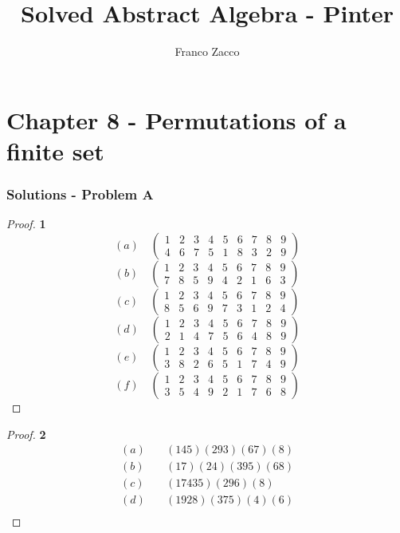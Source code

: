 \documentclass[11pt]{article}
\title{\textbf{Solved Abstract Algebra - Pinter}}
\author{Franco Zacco}
\date{}
\begin{document}
\maketitle
\thispagestyle{empty}

\section*{Chapter 8 - Permutations of a finite set}

	\subsubsection*{Solutions - Problem A}
		\begin{proof}{\textbf{1}} 
			$$(a) \quad \begin{pmatrix}
				1 & 2 & 3 & 4 & 5 & 6 & 7 & 8 & 9 \\
				4 & 6 & 7 & 5 & 1 & 8 & 3 & 2 & 9
			\end{pmatrix}$$
			$$(b) \quad \begin{pmatrix}
				1 & 2 & 3 & 4 & 5 & 6 & 7 & 8 & 9 \\
				7 & 8 & 5 & 9 & 4 & 2 & 1 & 6 & 3
			\end{pmatrix}$$
			$$(c) \quad \begin{pmatrix}
				1 & 2 & 3 & 4 & 5 & 6 & 7 & 8 & 9 \\
				8 & 5 & 6 & 9 & 7 & 3 & 1 & 2 & 4
			\end{pmatrix}$$
			$$(d) \quad \begin{pmatrix}
				1 & 2 & 3 & 4 & 5 & 6 & 7 & 8 & 9 \\
				2 & 1 & 4 & 7 & 5 & 6 & 4 & 8 & 9
			\end{pmatrix}$$
			$$(e) \quad \begin{pmatrix}
				1 & 2 & 3 & 4 & 5 & 6 & 7 & 8 & 9 \\
				3 & 8 & 2 & 6 & 5 & 1 & 7 & 4 & 9
			\end{pmatrix}$$
			$$(f) \quad \begin{pmatrix}
				1 & 2 & 3 & 4 & 5 & 6 & 7 & 8 & 9 \\
				3 & 5 & 4 & 9 & 2 & 1 & 7 & 6 & 8
			\end{pmatrix}$$
		\end{proof}
		\begin{proof}{\textbf{2}}
			\begin{align*}
				(a) &\quad (145)(293)(67)(8) \\
				(b) &\quad (17)(24)(395)(68) \\
				(c) &\quad (17435)(296)(8)   \\
				(d) &\quad (1928)(375)(4)(6) \\
			\end{align*}
		\end{proof}
\end{document}
